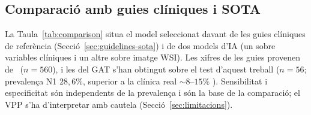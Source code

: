 \documentclass[10pt,a4paper,twocolumn,twoside]{article}
\begin{document}
\subsection{Comparació amb guies clíniques i SOTA}
\label{sec:resultats-comparacio}

La Taula~\ref{tab:comparison} situa el model seleccionat davant de les guies
clíniques de referència (Secció~\ref{sec:guidelines-sota}) i de dos models d'IA (un sobre
variables clíniques i un altre sobre imatge WSI).
Les xifres de les guies provenen de~\cite{tanino2024comparative} ($n\!=\!560$),
i les del GAT s'han obtingut sobre el test d'aquest treball ($n\!=\!56$;
prevalença N1 $28{,}6\%$, superior a la clínica real $\sim\!8$–$15\%$
\cite{zaffalon2023}). Sensibilitat i especificitat són independents de la
prevalença i són la base de la comparació; el VPP s'ha d'interpretar amb
cautela (Secció~\ref{sec:limitacions}).
\end{document}
